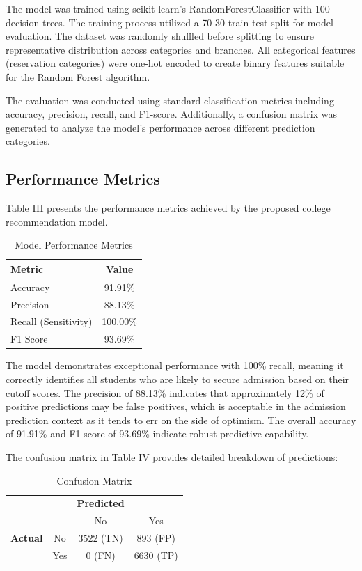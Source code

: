 \documentclass[journal]{IEEEtran}
\begin{document}
The model was trained using scikit-learn's RandomForestClassifier with 100 decision trees. The training process utilized a 70-30 train-test split for model evaluation. The dataset was randomly shuffled before splitting to ensure representative distribution across categories and branches. All categorical features (reservation categories) were one-hot encoded to create binary features suitable for the Random Forest algorithm.

The evaluation was conducted using standard classification metrics including accuracy, precision, recall, and F1-score. Additionally, a confusion matrix was generated to analyze the model's performance across different prediction categories.

\subsection{Performance Metrics}
Table III presents the performance metrics achieved by the proposed college recommendation model.

\begin{table}[htbp]
\caption{Model Performance Metrics}
\begin{center}
\begin{tabular}{lc}
\hline
\textbf{Metric} & \textbf{Value} \\
\hline
Accuracy & 91.91\% \\
Precision & 88.13\% \\
Recall (Sensitivity) & 100.00\% \\
F1 Score & 93.69\% \\
\hline
\end{tabular}
\label{tab3}
\end{center}
\end{table}

The model demonstrates exceptional performance with 100\% recall, meaning it correctly identifies all students who are likely to secure admission based on their cutoff scores. The precision of 88.13\% indicates that approximately 12\% of positive predictions may be false positives, which is acceptable in the admission prediction context as it tends to err on the side of optimism. The overall accuracy of 91.91\% and F1-score of 93.69\% indicate robust predictive capability.

The confusion matrix in Table IV provides detailed breakdown of predictions:

\begin{table}[htbp]
\caption{Confusion Matrix}
\begin{center}
\begin{tabular}{lccc}
\hline
 &  & \textbf{Predicted} & \\
 &  & No & Yes \\
\hline
\textbf{Actual} & No & 3522 (TN) & 893 (FP) \\
 & Yes & 0 (FN) & 6630 (TP) \\
\hline
\end{tabular}
\label{tab4}
\end{center}
\end{table}
\end{document}
